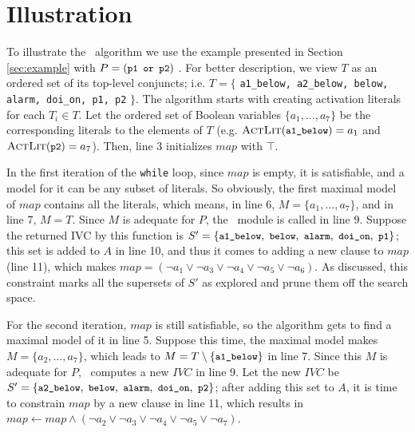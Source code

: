 \section{Illustration}
\label{sec:illust}
To illustrate the \aivcalg ~algorithm we use the example presented in Section \ref{sec:example} with $P = (\small{\texttt{p1 or p2}})$ .
For better description, we view $T$ as an ordered set of its top-level conjuncts; i.e. $T = \{$ {\small \texttt{a1\_below, a2\_below, below, alarm, doi\_on, p1, p2}} $\}$.
The algorithm starts with creating activation literals for each $T_i \in T$. Let the ordered set of Boolean variables $\{ a_1, \ldots , a_7 \}$ be the corresponding literals to the elements of $T$ (e.g. $\actlit (\small{\texttt{a1\_below}}) = a_1$ and $\actlit (\small{\texttt{p2}}) = a_7$). Then, line 3 initializes $map$ with $\top$.

In the first iteration of the \texttt{while} loop, since $map$ is empty,
it is satisfiable, and a model for it can
be any subset of literals. So obviously, the first maximal model of $map$ contains all the literals, which means, in line 6, $M = \{a_1, \ldots, a_7\}$,
 and in line 7, $M = T$. Since $M$ is adequate for $P$,
 the \getivc ~module is called in line 9.
 Suppose the returned IVC by this function  is
 $S' = \{ \small{ \texttt{a1\_below},~\texttt{below}, ~\texttt{alarm},
~\texttt{doi\_on},~\texttt{p1}}\}$;
this set is added to $A$ in line 10, and thus it comes to adding a new clause to $map$ (line 11), which makes $map = (\neg a_1 \vee \neg a_3 \vee \neg a_4 \vee \neg a_5 \vee \neg a_6)$.
As discussed, this constraint marks all the supersets of $S'$ as explored and prune them off the search space.

For the second iteration, $map$ is still satisfiable,
so the algorithm gets to find a maximal model of it in line 5. Suppose this time, the maximal model makes $M = \{a_2, \ldots, a_7\}$,
which leads to $M = T \setminus \{\small{\texttt{a1\_below}}\} $ in line 7.
Since this $M$ is adequate for $P$, \getivc ~computes a new $IVC$ in line 9.
Let the new $IVC$ be $S' = \{ \small{ \texttt{a2\_below},~\texttt{below}, ~\texttt{alarm},
~\texttt{doi\_on},~\texttt{p2}}\}$; after adding this set to $A$,
it is time to constrain $map$ by a new clause in line 11,
which results in $map \leftarrow map \wedge (\neg a_2 \vee \neg a_3 \vee \neg a_4 \vee \neg a_5 \vee \neg a_7)$.

